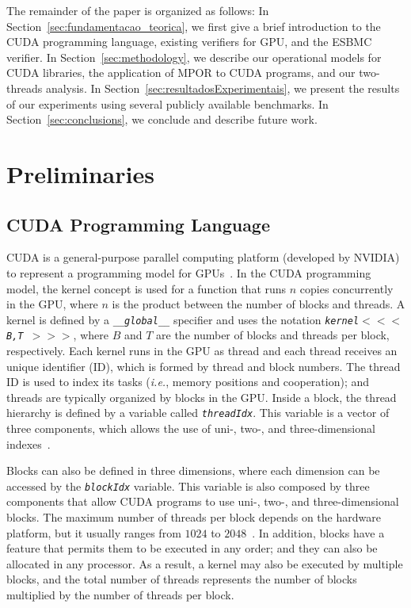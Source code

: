 \documentclass[times, doublespace]{cpeauth}
\begin{document}
The remainder of the paper is organized as follows: In Section~\ref{sec:fundamentacao_teorica}, we first give a brief introduction to the CUDA programming language, existing verifiers for GPU, and the ESBMC verifier. In Section~\ref{sec:methodology}, we describe our operational models for CUDA libraries, the application of MPOR to CUDA programs, and our two-threads analysis. In Section~\ref{sec:resultadosExperimentais}, we present the results of our experiments using several publicly available benchmarks. In Section~\ref{sec:conclusions}, we conclude and describe future work.

\vspace{-6pt}
\section{Preliminaries}
\vspace{-2pt}
\label{sec:fundamentacao_teorica}

\subsection{CUDA Programming Language}
\vspace{-2pt}
\label{ssec:linguagem_cuda}

CUDA is a general-purpose parallel computing platform (developed by NVIDIA) to represent a programming model for GPUs~\cite{cuda:2012,cudaproguide:2015}. In the CUDA programming model, the kernel concept is used for a function that runs $n$ copies concurrently in the GPU, where $n$ is the product between the number of blocks and threads. A kernel is defined by a \emph{\tt \_\_global\_\_} specifier and uses the notation \emph{\tt kernel$<<<$ B,T $>>>$}, where $B$ and $T$ are the number of blocks and threads per block, respectively. Each kernel runs in the GPU as thread and each thread receives an unique identifier (ID), which is formed by thread and block numbers. The thread ID is used to index its tasks ({\it i.e.}, memory positions and cooperation); and threads are typically organized by blocks in the GPU.
Inside a block, the thread hierarchy is defined by a variable called \emph{\tt threadIdx}. This variable is a vector of three components, which allows the use of uni-, two-, and three-dimensional indexes~\cite{cudaproguide:2015}. 

Blocks can also be defined in three dimensions, where each dimension can be accessed by the \emph{\tt blockIdx} variable. This variable is also composed by three components that allow CUDA programs to use uni-, two-, and three-dimensional blocks.
The maximum number of threads per block depends on the hardware platform, but it usually ranges from $1024$ to $2048$~\cite{cudaproguide:2015}. In addition, blocks have a feature that permits them to be executed in any order; and they can also be allocated in any processor. As a result, a kernel may also be executed by multiple blocks, and the total number of threads represents the number of blocks multiplied by the number of threads per block.
\end{document}
